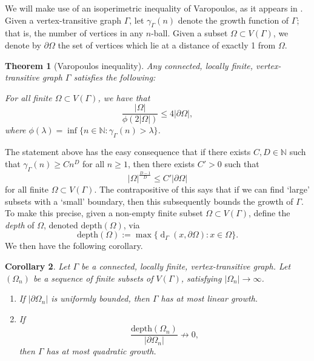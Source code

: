\documentclass[11pt,a4paper]{amsart}
\DeclareMathOperator{\dist}{d}
\newcommand{\N}{\mathbb{N}}
\newtheorem{theorem}{Theorem}[section]%
\newtheorem{corollary}[theorem]{Corollary}
\theoremstyle{definition}
\begin{document}
We will make use of an isoperimetric inequality of Varopoulos, as it appears in \cite[Thm.~2.1]{saloff1995isoperimetric}.
Given a vertex-transitive graph $\Gamma$, let $\gamma_\Gamma(n)$ denote the growth function of $\Gamma$; that is, the number of vertices in any $n$-ball. Given a subset $\Omega \subset V(\Gamma)$, we denote by $\partial \Omega$ the set of vertices which lie at a distance of exactly 1 from $\Omega$. 

\begin{theorem}[Varopoulos inequality]
	Any connected, locally finite, vertex-transitive graph $\Gamma$ satisfies the following:
    
	For all finite  $\Omega \subset V(\Gamma)$, we have that 
	$$
	\frac{|\Omega|}{\phi(2|\Omega|)} \leq 4|\partial\Omega|,
	$$
	where $\phi(\lambda) = \inf\{n \in \N : \gamma_\Gamma(n) > \lambda\}$. 
\end{theorem}

The statement above has the easy consequence that if there exists $C, D \in \N$ such that $\gamma_\Gamma(n) \geq Cn^D$ for all $n \geq 1$, then there exists $C'> 0$ such that 
$$
|\Omega|^{\tfrac{D-1}{D}} \leq C' |\partial \Omega|
$$
for all finite  $\Omega \subset V(\Gamma)$.
The contrapositive of this says that if we can find `large' subsets with a `small' boundary, then this subsequently bounds the growth of $\Gamma$. 
To make this precise, given a non-empty finite subset $\Omega \subset V(\Gamma)$, define the \emph{depth} of $\Omega$, denoted $\mathrm{depth}(\Omega)$, via
$$
\mathrm{depth}(\Omega) := \max \{\dist_\Gamma(x, \partial \Omega) : x \in \Omega\}.
$$
We then have the following corollary.

\begin{corollary}\label{cor:varopoulos}
    Let $\Gamma$ be a connected, locally finite, vertex-transitive graph. Let $(\Omega_n)$ be a sequence of finite subsets of $V(\Gamma)$, satisfying $|\Omega_n| \to \infty$. \begin{enumerate}
        \item\label{itm:varop-cor-1} If $|\partial \Omega_n|$ is uniformly bounded, then $\Gamma$ has at most linear growth. 

        \item\label{itm:varop-cor-2} If $$
        \frac{\mathrm{depth}(\Omega_n)}{|\partial \Omega_n|} \not\to 0,
        $$ then $\Gamma$ has at most quadratic growth. 
    \end{enumerate}
\end{corollary}
\end{document}
